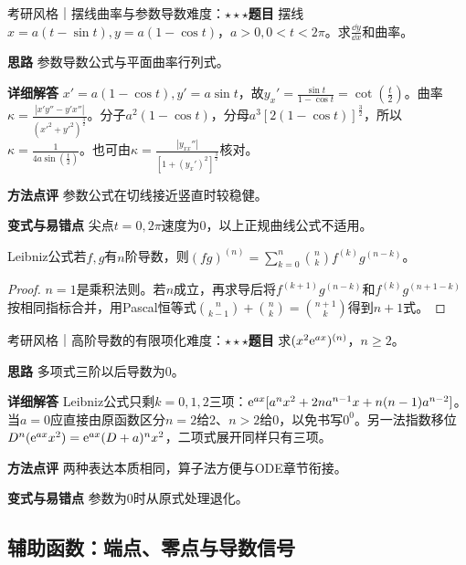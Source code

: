 \begin{example}{考研风格｜摆线曲率与参数导数}{难度：$\star\star\star$}\label{deep:ex:differential_source_deep:parametric}\textbf{题目} 摆线$x=a(t-\sin t),y=a(1-\cos t)$，$a>0,0<t<2\pi$。求$\frac{\dd y}{\dd x}$和曲率。\par\textbf{思路} 参数导数公式与平面曲率行列式。\par\textbf{详细解答} $x'=a(1-\cos t),y'=a\sin t$，故$y_x'=\frac{\sin t}{1-\cos t}=\cot(\frac{t}{2})$。曲率$\kappa=\frac{|x'y''-y'x''|}{(x'^2+y'^2)^{\frac{3}{2}}}$。分子$a^2(1-\cos t)$，分母$a^3[2(1-\cos t)]^{\frac{3}{2}}$，所以$\kappa=\frac{1}{4a\sin(\frac{t}{2})}$。也可由$\kappa=\frac{|y_{xx}''|}{[1+(y_x')^2]^{\frac{3}{2}}}$核对。\par\textbf{方法点评} 参数公式在切线接近竖直时较稳健。\par\textbf{变式与易错点} 尖点$t=0,2\pi$速度为0，以上正规曲线公式不适用。\end{example}

\begin{theorem}{Leibniz公式}若$f,g$有$n$阶导数，则$(fg)^{(n)}=\sum_{k=0}^n\binom nkf^{(k)}g^{(n-k)}$。\end{theorem}\begin{proof}$n=1$是乘积法则。若$n$成立，再求导后将$f^{(k+1)}g^{(n-k)}$和$f^{(k)}g^{(n+1-k)}$按相同指标合并，用Pascal恒等式$\binom n{k-1}+\binom nk=\binom{n+1}k$得到$n+1$式。\end{proof}

\begin{example}{考研风格｜高阶导数的有限项化}{难度：$\star\star\star$}\label{deep:ex:differential_source_deep:leibniz}\textbf{题目} 求$(x^2\mathrm{e}^{ax})^{(n)}$，$n\ge2$。\par\textbf{思路} 多项式三阶以后导数为0。\par\textbf{详细解答} Leibniz公式只剩$k=0,1,2$三项：$\mathrm{e}^{ax}[a^nx^2+2na^{n-1}x+n(n-1)a^{n-2}]$。当$a=0$应直接由原函数区分$n=2$给2、$n>2$给0，以免书写$0^0$。另一法指数移位$D^n(\mathrm{e}^{ax}x^2)=\mathrm{e}^{ax}(D+a)^nx^2$，二项式展开同样只有三项。\par\textbf{方法点评} 两种表达本质相同，算子法方便与ODE章节衔接。\par\textbf{变式与易错点} 参数为0时从原式处理退化。\end{example}

\subsection{辅助函数：端点、零点与导数信号}\label{deep:differential_source_deep:mvt}

